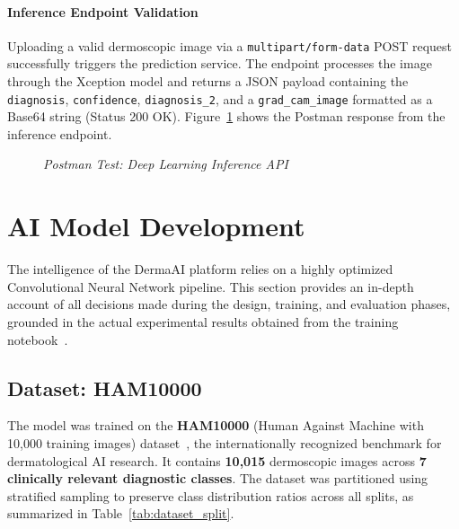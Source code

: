 \paragraph{Inference Endpoint Validation}
Uploading a valid dermoscopic image via a \texttt{multipart/form-data} POST request successfully triggers the prediction service. The endpoint processes the image through the Xception model and returns a JSON payload containing the \texttt{diagnosis}, \texttt{confidence}, \texttt{diagnosis\_2}, and a \texttt{grad\_cam\_image} formatted as a Base64 string (Status 200 OK). Figure~\ref{fig:api_scan} shows the Postman response from the inference endpoint.

\begin{figure}[H]
	\centering
	\caption{\textit{Postman Test: Deep Learning Inference API}}
	\label{fig:api_scan}
\end{figure}

\section{AI Model Development}
The intelligence of the DermaAI platform relies on a highly optimized Convolutional
Neural Network pipeline. This section provides an in-depth account of all decisions
made during the design, training, and evaluation phases, grounded in the actual
experimental results obtained from the training notebook~\cite{HAM10000, TensorFlow}.

\subsection{Dataset: HAM10000}
The model was trained on the \textbf{HAM10000} (Human Against Machine with 10,000
training images) dataset~\cite{HAM10000}, the internationally recognized benchmark
for dermatological AI research. It contains \textbf{10,015} dermoscopic images across
\textbf{7 clinically relevant diagnostic classes}. The dataset was partitioned using
stratified sampling to preserve class distribution ratios across all splits, as
summarized in Table~\ref{tab:dataset_split}.

